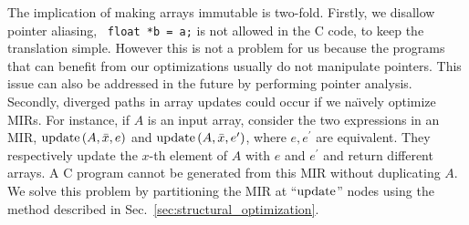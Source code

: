The implication of making arrays immutable is two-fold.  Firstly, we
disallow pointer aliasing, \ie~\verb|float *b = a;| is not allowed in the
C code, to keep the translation simple.  However this is not a problem
for us because the programs that can benefit from our optimizations
usually do not manipulate pointers.  This issue can also be addressed
in the future by performing pointer analysis. Secondly, diverged paths
in array updates could occur if we na{\"\i}vely optimize MIRs.  For
instance, if $A$ is an input array, consider the two expressions in an MIR,
$\operatorname{\mathrm{update}}\left({A}, {\bar{x}}, {e}\right)$ and $\operatorname{\mathrm{update}}\left({A}, {\bar{x}}, {e^\prime}\right)$, where $e,
e^\prime$ are equivalent.  They respectively update the $x$-th element of $A$
with $e$ and $e^\prime$ and return different arrays.  A C program cannot be
generated from this MIR without duplicating $A$.  We solve this problem by
partitioning the MIR at ``$\operatorname{\mathrm{update}}$'' nodes using the method described in
Sec.~\ref{sec:structural_optimization}.

